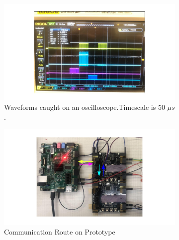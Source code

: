 \begin{figure}
\centering
\begin{subfigure}{.5\textwidth}
  \centering
  \includegraphics[width=\textwidth]{images/qdb_example_packet_waveform.pdf}
  \caption{Waveforms caught on an oscilloscope.\newline Timescale is 50 $\unit{\mu s}$.}
\end{subfigure}%
\begin{subfigure}{.5\textwidth}
  \centering
  \includegraphics[width=\textwidth]{images/qdb_example_packet_waveform_diagram.pdf}
  \caption{Communication Route on Prototype}
\end{subfigure}
\caption{}
\end{figure}

